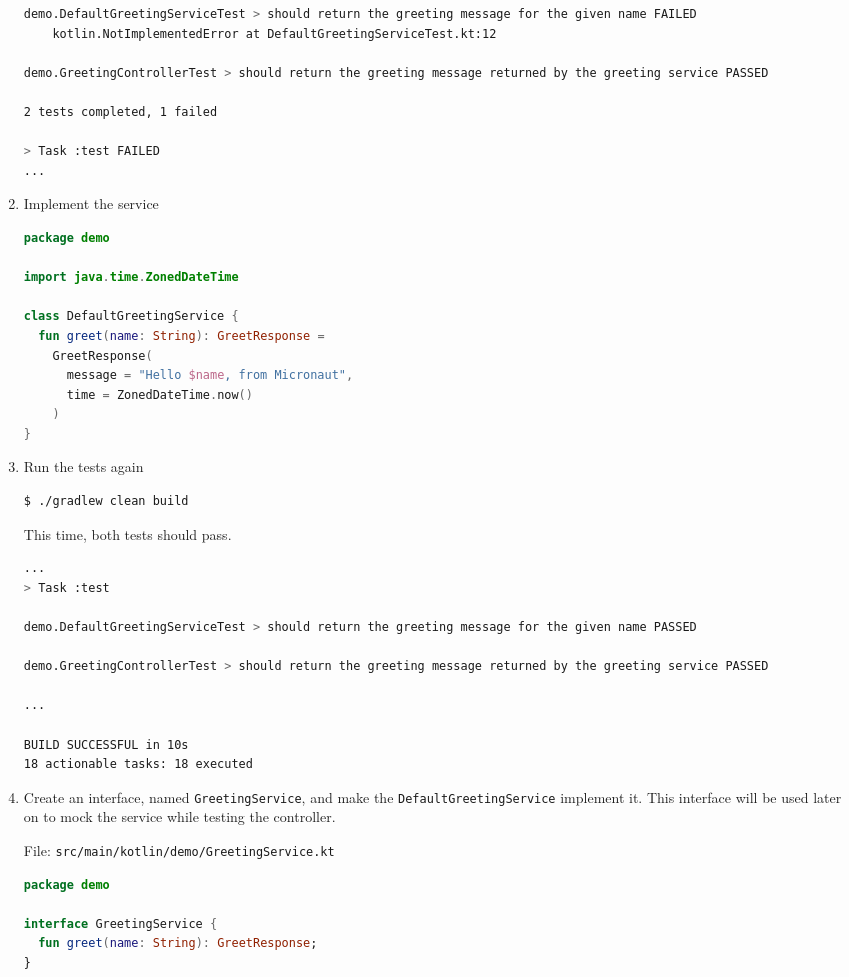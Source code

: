 \begin{enumerate}
\begin{lstlisting}[language=bash]
demo.DefaultGreetingServiceTest > should return the greeting message for the given name FAILED
    kotlin.NotImplementedError at DefaultGreetingServiceTest.kt:12

demo.GreetingControllerTest > should return the greeting message returned by the greeting service PASSED

2 tests completed, 1 failed

> Task :test FAILED
...
\end{lstlisting}

\item Implement the service

\begin{lstlisting}[language=Kotlin]
package demo

import java.time.ZonedDateTime

class DefaultGreetingService {
  fun greet(name: String): GreetResponse =
    GreetResponse(
      message = "Hello $name, from Micronaut",
      time = ZonedDateTime.now()
    )
}
\end{lstlisting}

\item Run the tests again

\begin{lstlisting}[language=bash]
$ ./gradlew clean build
\end{lstlisting}

This time, both tests should pass.

\begin{lstlisting}[language=bash]
...
> Task :test

demo.DefaultGreetingServiceTest > should return the greeting message for the given name PASSED

demo.GreetingControllerTest > should return the greeting message returned by the greeting service PASSED

...

BUILD SUCCESSFUL in 10s
18 actionable tasks: 18 executed
\end{lstlisting}

\item Create an interface, named \texttt{GreetingService}, and make the \texttt{DefaultGreetingService} implement it.  This interface will be used later on to mock the service while testing the controller.

File: \texttt{src/main/kotlin/demo/GreetingService.kt}
\begin{lstlisting}[language=Kotlin]
package demo

interface GreetingService {
  fun greet(name: String): GreetResponse;
}
\end{lstlisting}


\end{enumerate}
